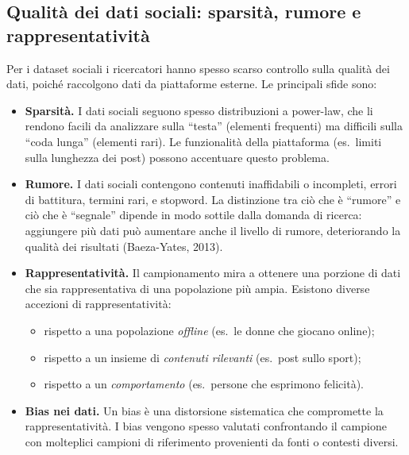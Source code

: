 \documentclass[12pt,a4paper]{article}
\begin{document}
\subsection{Qualità dei dati sociali: sparsità, rumore e rappresentatività}

Per i dataset sociali i ricercatori hanno spesso scarso controllo sulla qualità dei dati,
poiché raccolgono dati da piattaforme esterne. Le principali sfide sono:

\begin{itemize}
  \item \textbf{Sparsità.} I dati sociali seguono spesso distribuzioni a power-law,
        che li rendono facili da analizzare sulla ``testa'' (elementi frequenti) ma
        difficili sulla ``coda lunga'' (elementi rari). Le funzionalità della
        piattaforma (es.\ limiti sulla lunghezza dei post) possono accentuare
        questo problema.

  \item \textbf{Rumore.} I dati sociali contengono contenuti inaffidabili o
        incompleti, errori di battitura, termini rari, e stopword. La distinzione tra
        ciò che è ``rumore'' e ciò che è ``segnale'' dipende in modo sottile dalla
        domanda di ricerca: aggiungere più dati può aumentare anche il livello di
        rumore, deteriorando la qualità dei risultati (Baeza-Yates, 2013).

  \item \textbf{Rappresentatività.} Il campionamento mira a ottenere una porzione
        di dati che sia rappresentativa di una popolazione più ampia. Esistono diverse
        accezioni di rappresentatività:
        \begin{itemize}
          \item rispetto a una popolazione \emph{offline} (es.\ le donne che giocano
                online);
          \item rispetto a un insieme di \emph{contenuti rilevanti} (es.\ post sullo
                sport);
          \item rispetto a un \emph{comportamento} (es.\ persone che esprimono
                felicità).
        \end{itemize}

  \item \textbf{Bias nei dati.} Un bias è una distorsione sistematica che compromette
        la rappresentatività. I bias vengono spesso valutati confrontando il campione
        con molteplici campioni di riferimento provenienti da fonti o contesti diversi.
\end{itemize}
\end{document}
